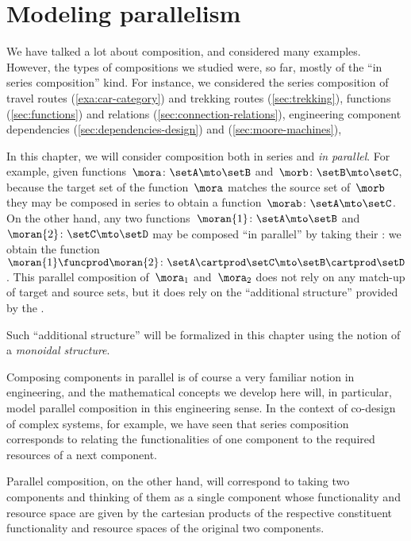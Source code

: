 
\section{Modeling parallelism}
\label{sec:modeling-parallelism}

We have talked a lot about composition, and considered many examples.
However, the types of compositions we studied were, so far, mostly of the ``in series composition'' kind.
For instance, we considered the series composition of travel routes (\cref{exa:car-category}) and trekking routes (\cref{sec:trekking}), functions (\cref{sec:functions}) and relations (\cref{sec:connection-relations}), engineering component dependencies (\cref{sec:dependencies-design}) and  (\cref{sec:moore-machines}), \etc

In this chapter, we will consider composition both in series and \emph{in parallel}.
For example, given functions~$\mora\colon \setA \mto \setB$ and~$\morb\colon \setB \mto \setC$, because the target set of the function~$\mora$ matches the source set of~$\morb$ they may be composed in series to obtain a function~$\morab\colon \setA \mto \setC$.
On the other hand, any two functions~$\moran{1} \colon \setA \mto \setB$ and~$\moran{2} \colon \setC \mto \setD$ may be composed ``in parallel'' by taking their : we obtain the function~$\moran{1} \funcprod \moran{2}\colon \setA \cartprod \setC \mto \setB \cartprod \setD$.
This parallel composition of~$\mora_1$ and~$\mora_2$ does not rely on any match-up of target and source sets, but it does rely on the ``additional structure'' provided by the .

Such ``additional structure'' will be formalized in this chapter using the notion of a \emph{monoidal structure}.

Composing components in parallel is of course a very familiar notion in engineering, and the mathematical concepts we develop here will, in particular, model parallel composition in this engineering sense.
In the context of co-design of complex systems, for example, we have seen that series composition corresponds to relating the functionalities of one component to the required resources of a next component.


Parallel composition, on the other hand, will correspond to taking two components and thinking of them as a single component whose functionality and resource space are given by the cartesian products of the respective constituent functionality and resource spaces of the original two components.

